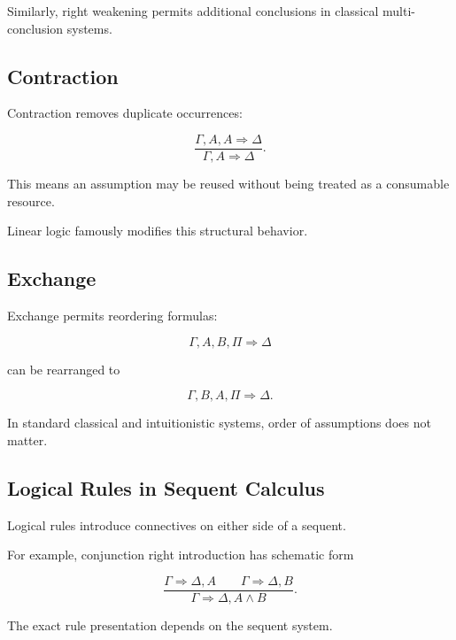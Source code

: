 Similarly, right weakening permits additional conclusions in classical
multi-conclusion systems.

\subsection{Contraction}
\label{subsec:contraction}

Contraction removes duplicate occurrences:

\[
\boxed{
\frac{
\Gamma,A,A\Rightarrow\Delta
}{
\Gamma,A\Rightarrow\Delta
}.
}
\]

This means an assumption may be reused without being treated as a
consumable resource.

Linear logic famously modifies this structural behavior.

\subsection{Exchange}
\label{subsec:exchange}

Exchange permits reordering formulas:

\[
\boxed{
\Gamma,A,B,\Pi
\Rightarrow
\Delta
}
\]

can be rearranged to

\[
\boxed{
\Gamma,B,A,\Pi
\Rightarrow
\Delta.
}
\]

In standard classical and intuitionistic systems, order of assumptions does
not matter.

\subsection{Logical Rules in Sequent Calculus}
\label{subsec:logical-sequent-rules}

Logical rules introduce connectives on either side of a sequent.

For example, conjunction right introduction has schematic form

\[
\boxed{
\frac{
\Gamma\Rightarrow\Delta,A
\qquad
\Gamma\Rightarrow\Delta,B
}{
\Gamma\Rightarrow\Delta,A\land B
}.
}
\]

The exact rule presentation depends on the sequent system.

